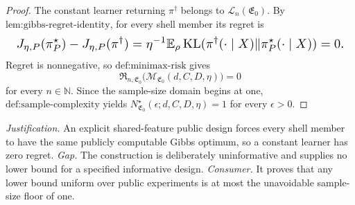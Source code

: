 \documentclass{article}
\begin{document}
\begin{proof}
The constant learner returning \(\pi^\dagger\) belongs to \(\mathcal L_n(\mathfrak E_0)\). By \(\text{lem:gibbs-regret-identity}\), for every shell member its regret is
\[
\makebox[\linewidth][c]{\resizebox{0.98\linewidth}{!}{\(\displaystyle J_{\eta,P}(\pi_P^\star)-J_{\eta,P}(\pi^\dagger)
=\eta^{-1}\mathbb E_\rho\operatorname{KL}(\pi^\dagger(\cdot\mid X)\Vert\pi_P^\star(\cdot\mid X))=0.\)}}
\]
Regret is nonnegative, so \(\text{def:minimax-risk}\) gives
\[
\mathfrak R_{n,\mathfrak E_0}\bigl(\mathcal M_{\mathfrak E_0}(d,C,D,\eta)\bigr)=0
\]
for every \(n\in\mathbb N\). Since the sample-size domain begins at one, \(\text{def:sample-complexity}\) yields \(N^\star_{\mathfrak E_0}(\epsilon;d,C,D,\eta)=1\) for every \(\epsilon>0\).
\end{proof}
\par\smallskip\noindent \textit{Justification.} An explicit shared-feature public design forces every shell member to have the same publicly computable Gibbs optimum, so a constant learner has zero regret. \textit{Gap.} The construction is deliberately uninformative and supplies no lower bound for a specified informative design. \textit{Consumer.} It proves that any lower bound uniform over public experiments is at most the unavoidable sample-size floor of one.
\end{document}
